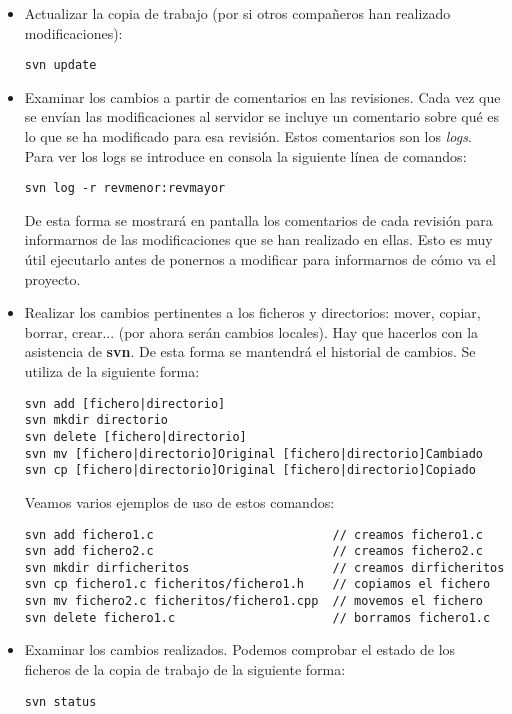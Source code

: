 \begin{itemize}
\item Actualizar la copia de trabajo (por si otros compañeros han
  realizado modificaciones):  
\begin{lstlisting}[style=consola]
svn update
\end{lstlisting}

\item Examinar los cambios a partir de comentarios en las
  revisiones. Cada vez que se envían las modificaciones al servidor se
  incluye un comentario sobre qué es lo que se ha modificado para esa
  revisión. Estos comentarios son los \textit{logs}. Para ver los logs
  se introduce en consola la siguiente línea de comandos: 
\begin{lstlisting}[style=consola]
svn log -r revmenor:revmayor 
\end{lstlisting}

De esta forma se mostrará en pantalla los comentarios de cada revisión
para informarnos de las modificaciones que se han realizado en
ellas. Esto es muy útil ejecutarlo antes de ponernos a modificar para
informarnos de cómo va el proyecto. 

\item Realizar los cambios pertinentes a los ficheros y directorios:
  mover, copiar, borrar, crear... (por ahora serán cambios
  locales). Hay que hacerlos con la asistencia de \textbf{svn}. De
  esta forma se mantendrá el historial de cambios. Se utiliza de la
  siguiente forma: 
\begin{lstlisting}[style=consola]
svn add [fichero|directorio]
svn mkdir directorio
svn delete [fichero|directorio]
svn mv [fichero|directorio]Original [fichero|directorio]Cambiado
svn cp [fichero|directorio]Original [fichero|directorio]Copiado
\end{lstlisting}

Veamos varios ejemplos de uso de estos comandos:
\begin{lstlisting}[style=consola]
svn add fichero1.c                         // creamos fichero1.c
svn add fichero2.c                         // creamos fichero2.c
svn mkdir dirficheritos                    // creamos dirficheritos
svn cp fichero1.c ficheritos/fichero1.h    // copiamos el fichero
svn mv fichero2.c ficheritos/fichero1.cpp  // movemos el fichero
svn delete fichero1.c                      // borramos fichero1.c
\end{lstlisting}

\item Examinar los cambios realizados. Podemos comprobar el estado de
  los ficheros de la copia de trabajo de la siguiente forma: 
\begin{lstlisting}[style=consola]
svn status
\end{lstlisting}


\end{itemize}
